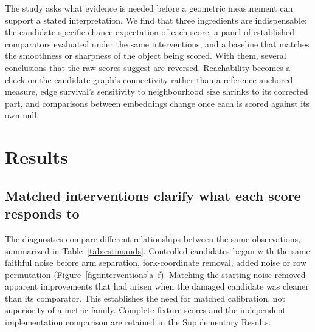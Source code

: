 \documentclass[11pt]{article}
\newcommand{\figpanel}[2]{Figure~\hyperref[#1]{\ref*{#1}#2}}
\begin{document}
The study asks what evidence is needed before a geometric measurement can support a stated interpretation. We find that three ingredients are indispensable: the candidate-specific chance expectation of each score, a panel of established comparators evaluated under the same interventions, and a baseline that matches the smoothness or sharpness of the object being scored. With them, several conclusions that the raw scores suggest are reversed. Reachability becomes a check on the candidate graph's connectivity rather than a reference-anchored measure, edge survival's sensitivity to neighbourhood size shrinks to its corrected part, and comparisons between embeddings change once each is scored against its own null.

\section{Results}
\subsection{Matched interventions clarify what each score responds to}
The diagnostics compare different relationships between the same observations, summarized in Table~\ref{tab:estimands}. Controlled candidates began with the same faithful noise before arm separation, fork-coordinate removal, added noise or row permutation (\figpanel{fig:interventions}{a--f}). Matching the starting noise removed apparent improvements that had arisen when the damaged candidate was cleaner than its comparator. This establishes the need for matched calibration, not superiority of a metric family. Complete fixture scores and the independent implementation comparison are retained in the Supplementary Results.
\end{document}
